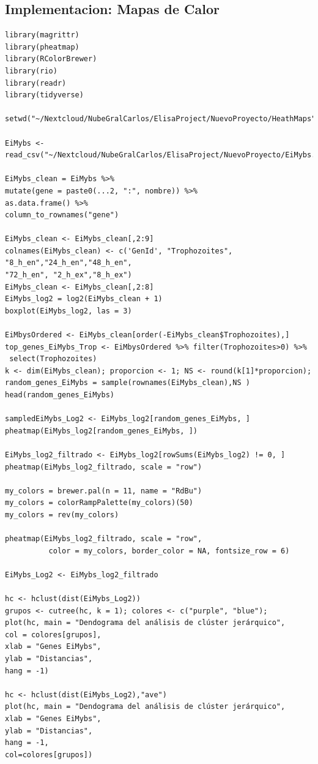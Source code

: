\documentclass{article}
\begin{document}
\subsection{Implementacion: Mapas de Calor}

\begin{verbatim}
library(magrittr)
library(pheatmap)
library(RColorBrewer)
library(rio)
library(readr)
library(tidyverse)

setwd("~/Nextcloud/NubeGralCarlos/ElisaProject/NuevoProyecto/HeathMaps")

EiMybs <- read_csv("~/Nextcloud/NubeGralCarlos/ElisaProject/NuevoProyecto/EiMybs.csv")

EiMybs_clean = EiMybs %>%
mutate(gene = paste0(...2, ":", nombre)) %>%
as.data.frame() %>%
column_to_rownames("gene")

EiMybs_clean <- EiMybs_clean[,2:9]
colnames(EiMybs_clean) <- c('GenId', "Trophozoites", "8_h_en","24_h_en","48_h_en",
"72_h_en", "2_h_ex","8_h_ex")
EiMybs_clean <- EiMybs_clean[,2:8]
EiMybs_log2 = log2(EiMybs_clean + 1)
boxplot(EiMybs_log2, las = 3)

EiMbysOrdered <- EiMybs_clean[order(-EiMybs_clean$Trophozoites),]
top_genes_EiMybs_Trop <- EiMbysOrdered %>% filter(Trophozoites>0) %>%
 select(Trophozoites)
k <- dim(EiMybs_clean); proporcion <- 1; NS <- round(k[1]*proporcion);
random_genes_EiMybs = sample(rownames(EiMybs_clean),NS )
head(random_genes_EiMybs)

sampledEiMybs_Log2 <- EiMybs_log2[random_genes_EiMybs, ]
pheatmap(EiMybs_log2[random_genes_EiMybs, ])

EiMybs_log2_filtrado <- EiMybs_log2[rowSums(EiMybs_log2) != 0, ]
pheatmap(EiMybs_log2_filtrado, scale = "row")

my_colors = brewer.pal(n = 11, name = "RdBu")
my_colors = colorRampPalette(my_colors)(50)
my_colors = rev(my_colors)

pheatmap(EiMybs_log2_filtrado, scale = "row", 
          color = my_colors, border_color = NA, fontsize_row = 6)

EiMybs_Log2 <- EiMybs_log2_filtrado

hc <- hclust(dist(EiMybs_Log2))
grupos <- cutree(hc, k = 1); colores <- c("purple", "blue");
plot(hc, main = "Dendograma del análisis de clúster jerárquico",
col = colores[grupos],
xlab = "Genes EiMybs",
ylab = "Distancias",
hang = -1)

hc <- hclust(dist(EiMybs_Log2),"ave")
plot(hc, main = "Dendograma del análisis de clúster jerárquico",
xlab = "Genes EiMybs",
ylab = "Distancias",
hang = -1,
col=colores[grupos])


\end{verbatim}
\end{document}
